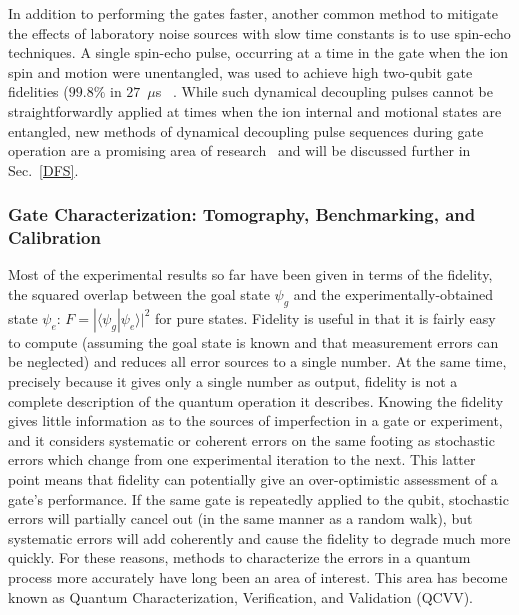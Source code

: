 \documentclass[%
reprint,
 amsmath,amssymb,
]{revtex4-1}
\begin{document}
In addition to performing the gates faster, another common method to mitigate the effects of laboratory noise sources with slow time constants is to use spin-echo techniques. A single spin-echo pulse, occurring at a time in the gate when the ion spin and motion were unentangled, was used to achieve high two-qubit gate fidelities ($99.8 \%$ in $27$~$\mu$s~ \cite{BallanceHybridLogic2015}. While such dynamical decoupling pulses cannot be straightforwardly applied at times when the ion internal and motional states are entangled, new methods of dynamical decoupling pulse sequences during gate operation are a promising area of research~\cite{manovitz2017fast} and will be discussed further in Sec.~\ref{DFS}.

    \subsubsection{Gate Characterization: Tomography, Benchmarking, and Calibration}

Most of the experimental results so far have been given in terms of the fidelity, the squared overlap between the goal state $\psi_g$ and the experimentally-obtained state $\psi_e$: $F = | \langle \psi_g | \psi_e \rangle |^2$ for pure states. Fidelity is useful in that it is fairly easy to compute (assuming the goal state is known and that measurement errors can be neglected) and reduces all error sources to a single number. At the same time, precisely because it gives only a single number as output, fidelity is not a complete description of the quantum operation it describes. Knowing the fidelity gives little information as to the sources of imperfection in a gate or experiment, and it considers systematic or coherent errors on the same footing as stochastic errors which change from one experimental iteration to the next. This latter point means that fidelity can potentially give an over-optimistic assessment of a gate's performance. If the same gate is repeatedly applied to the qubit, stochastic errors will partially cancel out (in the same manner as a random walk), but systematic errors will add coherently and cause the fidelity to degrade much more quickly. For these reasons, methods to characterize the errors in a quantum process more accurately have long been an area of interest. This area has become known as Quantum Characterization, Verification, and Validation (QCVV).
\end{document}
